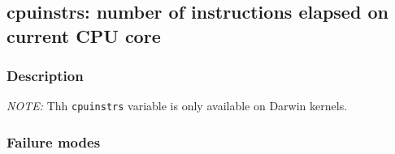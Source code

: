 \clearpage
{}
{}
\label{vars:cpuinstrs}
\subsection*{cpuinstrs: number of instructions elapsed on current CPU core}

\subsubsection*{Description}

\emph{NOTE:} Thh \verb|cpuinstrs| variable is only available on Darwin
kernels.

\subsubsection*{Failure modes}

